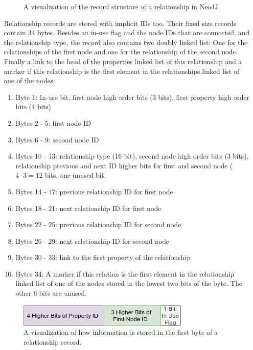 \documentclass[a4paper,10pt]{article}
\begin{document}
\begin{figure}[htp]
\begin{center}
                \end{center}
                \caption{A visualization of the record structure of a relationship in Neo4J.} %
            \end{figure}
            
            Relationship records are stored with implicit IDs too. Their fixed size records contain 34 bytes. Besides an in-use flag and the node IDs that are connected, and the relationship type, the record also contains two doubly linked list: One for the relationships of the first node and one for the relationship of the second node. Finally a link to the head of the properties linked list of this relationship and a marker if this relationship is the first element in the relationships linked list of one of the nodes.
            \newpage
            
            \begin{enumerate}
                \item Byte 1: In-use bit, first node high order bits (3 bits), first property high order bits (4 bits)
                \item Bytes 2 - 5: first node ID 
                \item Bytes 6 - 9: second node ID 
                \item Bytes 10 - 13: relationship type (16 bit), second node high order bits (3 bits), relationship previous and next ID higher bits for first and second node ($4 \cdot 3 = 12$ bits, one unused bit.
                \item Bytes 14 - 17: previous relationship ID for first node
                \item Bytes 18 - 21: next relationship ID for first node
                \item Bytes 22 - 25: previous relationship ID for second node
                \item Bytes 26 - 29: next relationship ID for second node
                \item Bytes 30 - 33: link to the first property of the relationship
                \item Bytes 34: A marker if this relation is the first element in the relationship linked list of one of the nodes stored in the lowest two bits of the byte. The other 6 bits are unused.
            \end{enumerate}


            \begin{figure}[htp]\label{rel_first_byte}
                \begin{center}
                    \includegraphics[keepaspectratio,width=\textwidth]{img/03_record/relationship/relationship_first_byte.png}
                \end{center}
                \caption{A visualization of how information is stored in the first byte of a relationship record.} %
            \end{figure}
\end{document}

